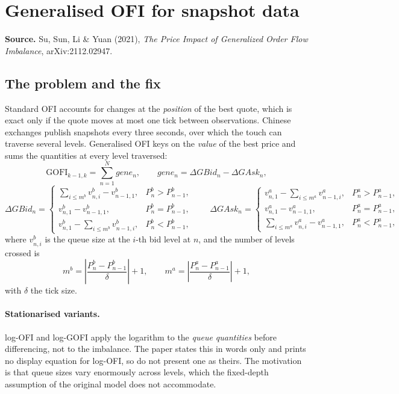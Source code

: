 \documentclass[11pt]{article}
\begin{document}
\section{Generalised OFI for snapshot data}\label{sec:gofi}

\textbf{Source.} Su, Sun, Li \& Yuan (2021), \emph{The Price Impact of
Generalized Order Flow Imbalance}, arXiv:2112.02947.

\subsection{The problem and the fix}

Standard OFI accounts for changes at the \emph{position} of the best quote,
which is exact only if the quote moves at most one tick between observations.
Chinese exchanges publish snapshots every three seconds, over which the touch
can traverse several levels. Generalised OFI keys on the \emph{value} of the
best price and sums the quantities at every level traversed:
\begin{equation}
\mathrm{GOFI}_{k-1,k}=\sum_{n=1}^{N} gene_n, \qquad gene_n=\Delta GBid_n-\Delta GAsk_n,
\end{equation}
\begin{equation}
\Delta GBid_n=
\begin{cases}
\sum_{i\le m^b} v^b_{n,i}-v^b_{n-1,1}, & P^b_n>P^b_{n-1},\\
v^b_{n,1}-v^b_{n-1,1}, & P^b_n=P^b_{n-1},\\
v^b_{n,1}-\sum_{i\le m^b} v^b_{n-1,i}, & P^b_n<P^b_{n-1},
\end{cases}
\qquad
\Delta GAsk_n=
\begin{cases}
v^a_{n,1}-\sum_{i\le m^a} v^a_{n-1,i}, & P^a_n>P^a_{n-1},\\
v^a_{n,1}-v^a_{n-1,1}, & P^a_n=P^a_{n-1},\\
\sum_{i\le m^a} v^a_{n,i}-v^a_{n-1,1}, & P^a_n<P^a_{n-1},
\end{cases}
\end{equation}
where $v^{b}_{n,i}$ is the queue size at the $i$-th bid level at $n$, and the
number of levels crossed is
\begin{equation}
m^b=\left|\frac{P^b_n-P^b_{n-1}}{\delta}\right|+1,
\qquad
m^a=\left|\frac{P^a_n-P^a_{n-1}}{\delta}\right|+1,
\end{equation}
with $\delta$ the tick size.

\paragraph{Stationarised variants.} log-OFI and log-GOFI apply the logarithm to
the \emph{queue quantities} before differencing, not to the imbalance. The paper
states this in words only and prints no display equation for log-OFI, so do not
present one as theirs. The motivation is that queue sizes vary enormously
across levels, which the fixed-depth assumption of the original model does not
accommodate.
\end{document}
